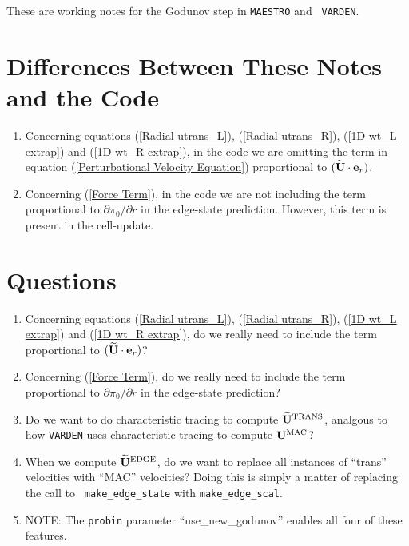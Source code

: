 These are working notes for the Godunov step in {\tt MAESTRO} and {\tt
  VARDEN}.

\section{Differences Between These Notes and the Code}
\begin{enumerate}
\item Concerning equations (\ref{Radial utrans_L}), (\ref{Radial
  utrans_R}), (\ref{1D wt_L extrap}) and (\ref{1D wt_R extrap}), in
  the code we are omitting the term in equation (\ref{Perturbational
    Velocity Equation}) proportional to $(\widetilde{{\bf U}}\cdot{\bf e}_r)$.
\item Concerning (\ref{Force Term}), in the code we are not including
  the term proportional to $\partial\pi_0/\partial r$ in the
  edge-state prediction.  However, this term is present in the
  cell-update.
\end{enumerate}

\section{Questions}
\begin{enumerate}
\item Concerning equations (\ref{Radial utrans_L}), (\ref{Radial
  utrans_R}), (\ref{1D wt_L extrap}) and (\ref{1D wt_R extrap}), do we
  really need to include the term proportional to $(\widetilde{{\bf U}}\cdot{\bf e}_r)$?
\item Concerning (\ref{Force Term}), do we really need to include the
  term proportional to $\partial\pi_0/\partial r$ in the edge-state
  prediction?
\item Do we want to do characteristic tracing to compute
  $\widetilde{{\bf U}}^{\rm TRANS}$, analgous to how {\tt VARDEN} uses characteristic
  tracing to compute ${\bf U}^{\rm MAC}$?
\item When we compute $\widetilde{{\bf U}}^{\rm EDGE}$, do we want to replace all
  instances of ``trans'' velocities with ``MAC'' velocities?  Doing
  this is simply a matter of replacing the call to {\tt
    make\_edge\_state} with {\tt make\_edge\_scal}.
\item NOTE: The {\tt probin} parameter ``use\_new\_godunov'' enables all four of these features.
\end{enumerate}

